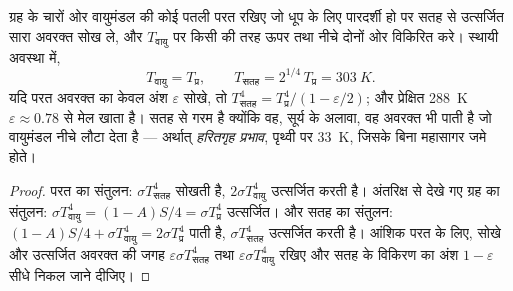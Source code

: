 \begin{proposition}[एक-परत हरितगृह प्रतिरूप]\label{prop:b2:thermal-radiation:greenhouse}
ग्रह के चारों ओर वायुमंडल की कोई पतली परत रखिए जो धूप के लिए पारदर्शी
हो पर सतह से उत्सर्जित सारा अवरक्त सोख ले, और
$T_{\text{वायु}}$ पर किसी  की तरह ऊपर तथा नीचे दोनों ओर विकिरित करे। स्थायी
अवस्था में,
\[
T_{\text{वायु}} = T_{\text{प्र}}, \qquad
T_{\text{सतह}} = 2^{1/4}\,T_{\text{प्र}} = \qty{303}{K} .
\]
यदि परत अवरक्त का केवल अंश $\varepsilon$ सोखे, तो
$T_{\text{सतह}}^4 = T_{\text{प्र}}^4/(1 - \varepsilon/2)$; और प्रेक्षित
\qty{288}{K} $\varepsilon \approx 0.78$ से मेल खाता है। सतह  से
गरम है क्योंकि वह, सूर्य के अलावा, वह अवरक्त भी पाती है जो
वायुमंडल नीचे लौटा देता है --- अर्थात्
\emph{हरितगृह प्रभाव}, पृथ्वी पर \qty{33}{K},
जिसके बिना महासागर जमे होते।
\end{proposition}

\begin{proof}
परत का संतुलन: $\sigma T_{\text{सतह}}^4$ सोखती है, $2\sigma
T_{\text{वायु}}^4$ उत्सर्जित करती है। अंतरिक्ष से देखे गए ग्रह का संतुलन: $\sigma
T_{\text{वायु}}^4 = (1 - A)S/4 = \sigma T_{\text{प्र}}^4$ उत्सर्जित। और
सतह का संतुलन: $(1 - A)S/4 + \sigma T_{\text{वायु}}^4 = 2\sigma T_{\text{प्र}}^4$ पाती है,
$\sigma T_{\text{सतह}}^4$ उत्सर्जित करती है। आंशिक परत के लिए, सोखे और
उत्सर्जित अवरक्त की जगह $\varepsilon\sigma T_{\text{सतह}}^4$ तथा
$\varepsilon\sigma T_{\text{वायु}}^4$ रखिए और सतह के विकिरण का अंश $1 - \varepsilon$
सीधे निकल जाने दीजिए।
\end{proof}


